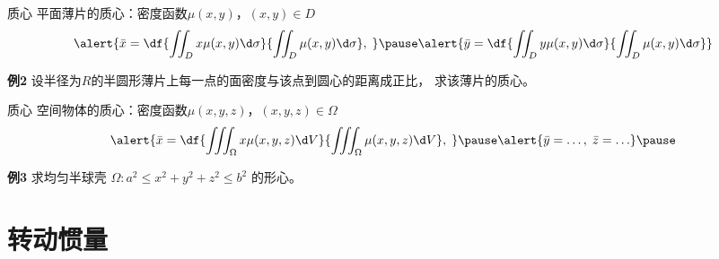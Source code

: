 \begin{frame}{质心}
	\linespread{1.2}
	{\bb 平面薄片的质心：}\pause 密度函数$\mu(x,y)$，$(x,y)\in D$\pause
	$$\alert{\bar{x}=\df{\displaystyle\iint_Dx\mu(x,y)\d\sigma}
	{\displaystyle\iint_D\mu(x,y)\d\sigma},\;}\pause 
	\alert{\bar{y}=\df{\displaystyle\iint_Dy\mu(x,y)\d\sigma}
	{\displaystyle\iint_D\mu(x,y)\d\sigma}}$$
	\pause
	\begin{exampleblock}{{\bf 例2}\hfill}
		设半径为$R$的半圆形薄片上每一点的面密度与该点到圆心的距离成正比，
		求该薄片的质心。
	\end{exampleblock}
\end{frame}

\begin{frame}{质心}
	\linespread{1.2}\pause 
	{\bb 空间物体的质心：}\pause 密度函数$\mu(x,y,z)$，$(x,y,z)\in\Omega$\pause
	$$\alert{\bar{x}=\df{\displaystyle\iiint_{\Omega}x\mu(x,y,z)\d V}
	{\displaystyle\iiint_{\Omega}\mu(x,y,z)\d V},\;}\pause
	\alert{\bar{y}=\ldots,\;\bar{z}=\ldots}\pause
	$$
	\begin{exampleblock}{{\bf 例3}\hfill}
		求均匀半球壳
		$\Omega:a^2\leq x^2+y^2+z^2\leq b^2$
		的形心。
	\end{exampleblock}
\end{frame}


\section{转动惯量}

